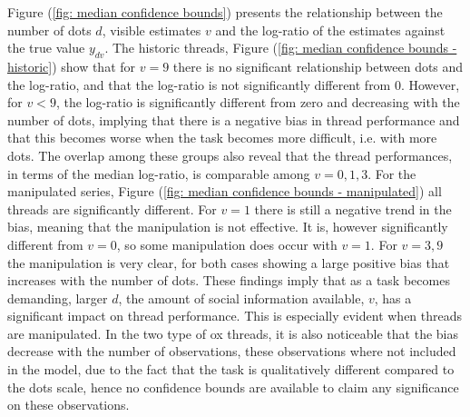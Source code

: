 \documentclass[10pt,a4paper,twocolumn,lineno]{article}
\begin{document}
Figure (\ref{fig: median confidence bounds}) presents the relationship between the number of dots $d$, visible estimates $v$ and the log-ratio of the estimates against the true value $y_{dv}$. The historic threads, Figure (\ref{fig: median confidence bounds - historic}) show that for $v=9$ there is no significant relationship between dots and the log-ratio, and that the log-ratio is not significantly different from 0. However, for $v<9$, the log-ratio is significantly different from zero and decreasing with the number of dots, implying that there is a negative bias in thread performance and that this becomes worse when the task becomes more difficult, i.e. with more dots. The overlap among these groups also reveal that the thread performances, in terms of the median log-ratio, is comparable among $v=0,1,3$. For the manipulated series, Figure (\ref{fig: median confidence bounds - manipulated}) all threads are significantly different. For $v=1$ there is still a negative trend in the bias, meaning that the manipulation is not effective. It is, however significantly different from $v=0$, so some manipulation does occur with $v=1$. For $v=3,9$ the manipulation is very clear, for both cases showing a large positive bias that increases with the number of dots. These findings imply that as a task becomes demanding, larger $d$, the amount of social information available, $v$, has a significant impact on thread performance. This is especially evident when threads are manipulated. In the two type of ox threads, it is also noticeable that the bias decrease with the number of observations, these observations where not included in the model, due to the fact that the task is qualitatively different compared to the dots scale, hence no confidence bounds are available to claim any significance on these observations.
\end{document}

